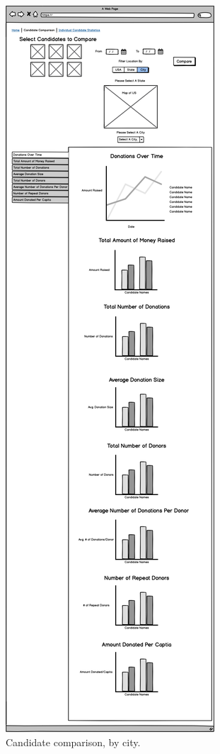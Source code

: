 \documentclass[12pt]{article}
\begin{document}
    \begin{figure}[H]
        \begin{center}
        \includegraphics[scale=.20]{candidatecompbycity}
        \caption{Candidate comparison, by city.}
        \label{fig:4}
        \end{center}
    \end{figure}
\end{document}
